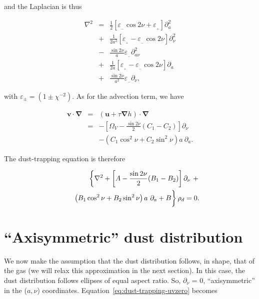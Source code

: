 \documentclass[apj]{emulateapj}
\renewcommand{\v}[1]{{\boldsymbol{#1}}} %
\def\white#1{\textcolor{white}{#1}}
\newcommand{\del}{\v{\nabla}}
\newcommand{\grad}{\del}
\newcommand{\Laplace}{\nabla^2}
\newcommand{\beq}{\begin{equation}}
\newcommand{\eeq}{\end{equation}}
\newcommand{\beqn}{\begin{eqnarray}}
\newcommand{\eeqn}{\end{eqnarray}}
\newcommand{\epsp}{\varepsilon_{_{+}}}
\newcommand{\epsm}{\varepsilon_{_{-}}}
\begin{document}
\noindent and the Laplacian is thus 

\beqn
\Laplace{} &= &\frac{1}{2}\left[ \epsm \cos 2\nu +  \epsp\right] \partial^2_a  \nonumber \\
                &+& \frac{1}{2a^2}\left[ \epsp - \epsm \cos 2\nu\right] \partial^2_\nu \nonumber \\
                &-& \frac{\sin 2\nu}{a}\epsm \partial^2_{a\nu}   \nonumber \\
                &+& \frac{1}{2a}\left[ \epsp - \epsm \cos 2\nu\right] \partial_a \nonumber \\
                &+& \frac{\sin 2\nu}{a^2} \epsm\partial_\nu, \label{eq:laplace}
\eeqn

\noindent with $\varepsilon_{\pm} = (1 \pm \chi^{-2})$.  As for the advection term, we have 

\beqn
\v{v}\cdot\del &=& (\v{u} + \tau \grad h) \cdot \del \nonumber \\
&=& - \left[\varOmega_V - \frac{\sin2\nu}{2}  (C_1 -  C_2)\right]\partial_\nu \nonumber \\
&&- \left( C_1 \cos^2\nu   + C_2\sin^2\nu \right) a \ \partial_a. \label{eq:advection-term}
\eeqn


The dust-trapping equation is therefore 


\beqn 
&& \left\{ \Laplace{} + \left[A - \frac{\sin2\nu}{2}  (B_1 - B_2)\right]\partial_\nu \ +  \right.  \nonumber\\
&& \left. \white{\frac{1}{1}}\left( B_1 \cos^2\nu   + B_2\sin^2\nu
  \right) a \ \partial_a  + B \right\} \rho_d = 0. \label{eq:dust-trapping-uvzero}
\eeqn



\section{``Axisymmetric'' dust distribution}

We now make the assumption that the dust distribution follows, in shape, that of
the gas (we will relax this approximation in the next section). In this case, the
dust distribution follows ellipses of equal aspect ratio. So,
$\partial_\nu$ = 0, ``axisymmetric'' in the ($a,\nu$)
coordinates. Equation~\ref{eq:dust-trapping-uvzero} becomes
\end{document}
